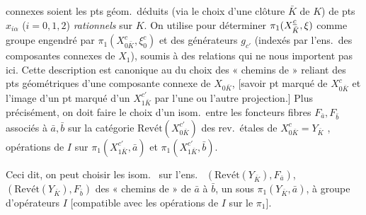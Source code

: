 \documentclass[11pt,a4paper]{article}
\begin{document}

connexes soient les pts géom.\ déduits (via le choix d'une clôture  $\bar K$ de $K$) de pts $x_{i\alpha}$ ($i = 0, 1, 2$)  \emph{rationnels} sur $K$. On utilise  pour déterminer $\pi_1(X^{\uncertain{c}}_{\bar K}, \xi)$ comme groupe engendré par  $\pi_1(X^c_{0\bar K}, \xi^c_0)$ et des générateurs $g_{c'}$ (indexés par l'ens.\ des composantes connexes de $X_1$), soumis à des relations  qui ne nous importent pas ici.    Cette description est canonique au   du choix des \struck{\ill{}} « chemins de  » reliant des pts géométriques  d'une \struck{\ill{}} composante connexe  de $X_{0\bar K}$, \struck{\ill{}} [savoir  pt marqué de $X^c_{0\bar K}$ et l'image d'un pt marqué d'un $X^{c'}_{1\bar K}$ par l'une ou l'autre projection.] \struck{\ill{}}  \struck{\ill{}} Plus précisément, \struck{\ill{}} on doit faire le choix d'un isom.\ entre les foncteurs fibres $F_{\bar a}, F_{\bar b}$ associés à $\bar a, \bar b$ sur la catégorie $\mathrm{Revét}(X^{c'}_{0\bar K})$ des rev.\ étales de $X^{c}_{0\bar K} = Y_{\bar K}$  ,  \struck{\ill{} transport de structure $I = \mathrm{Gal}(\bar K/K)$ opère par \ill{} sur les foncteurs fibres $F_{\bar a}, F_{\bar b}$ [d…}   opérations de $I$ sur $\pi_1(X^{c'}_{1\bar K}, \bar a)$ et $\pi_1(X^{c'}_{1\bar K}, \bar b)$.

Ceci dit, on peut choisir les isom.\   sur l'ens.\ \struck{\ill{}}  $(\mathrm{Revét}(Y_{\bar K}), F_{\bar a})$, $(\mathrm{Revét}(Y_{\bar K}), F_{\bar b})$ \add{\uncertain{\ill{}}} des « chemins de  » de $\bar a$ à $\bar b$,   un  sous $\pi_1(Y_{\bar K}, \bar a)$, à groupe d'opérateurs $I$ [compatible \struck{\ill{}} avec les opérations de $I$ sur le $\pi_1$].
\end{document}
